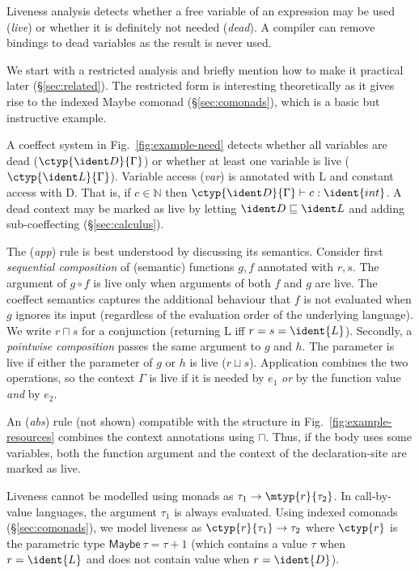 Liveness analysis detects whether a free variable of an expression may be used (\emph{live}) or 
whether it is definitely not needed (\emph{dead}). A compiler can remove
bindings to dead variables as the result is never used. 

We start with a restricted analysis and briefly mention how to make it practical
later (\S\ref{sec:related}). The restricted form is interesting theoretically as it gives rise
to the indexed Maybe comonad (\S\ref{sec:comonads}), which is a basic but instructive example.

A coeffect system in Fig.~\ref{fig:example-need} detects whether all variables are dead 
($\ctyp{\ident D}{\Gamma}$) or whether at least one variable is live ($\ctyp{\ident L}{\Gamma}$). 
Variable access (\emph{var}) is annotated with \ident L and constant access with \ident D. That is,
if $c\in\mathbb{N}$ then $\ctyp{\ident D}{\Gamma} \vdash c : \ident{int}$.
A dead context may be marked as live by
letting $\ident D \sqsubseteq \ident L$ and adding sub-coeffecting (\S\ref{sec:calculus}).

The (\emph{app}) rule is best understood by discussing its semantics. Consider first 
\emph{sequential composition} of (semantic) functions $g, f$ annotated with $r, s$. 
The argument of $g \circ f$ is live only when arguments of both $f$ and $g$ are live. 
The coeffect semantics captures the additional behaviour that $f$ is not evaluated when
$g$ ignores its input (regardless of the evaluation order of the underlying language).
We write $r \sqcap s$ for a conjunction (returning \ident L iff $r = s = \ident{L}$). 
Secondly, a \emph{pointwise composition} passes the same
argument to $g$ and $h$. The parameter is live if either the parameter
of $g$ or $h$ is live ($r \sqcup s$). Application combines the
two operations, so the context $\Gamma$ is live if it is needed by
$e_1$ \emph{or} by the function value \emph{and} by $e_2$.

An (\emph{abs}) rule (not shown) compatible with the structure in Fig.~\ref{fig:example-resources}
combines the context annotations using $\sqcap$. Thus, if the body uses some 
variables, both the function argument and the context of the declaration-site are marked as live.

Liveness cannot be modelled using monads as $\tau_1 \rightarrow \mtyp{r}{\tau_2}$.
In call-by-value languages, the argument $\tau_1$ is always evaluated. Using 
indexed comonads (\S\ref{sec:comonads}), we
model liveness as $\ctyp{r}{\tau_1} \rightarrow \tau_2$ where
$\ctyp{r}$ is the parametric type $\mathsf{Maybe}~\tau = \tau + 1$
(which contains a value $\tau$ when $r=\ident{L}$ and does not contain
value when $r=\ident{D}$).

